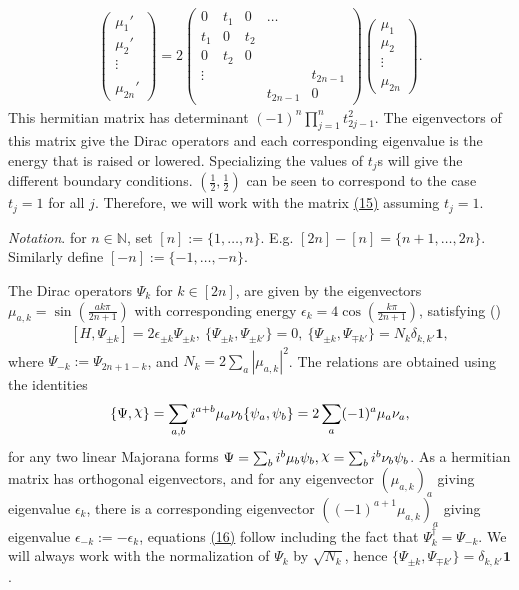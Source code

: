 \documentclass[twoside,11pt,titlepage]{amsart}
\newcommand{\abs}[1]{\left| #1 \right|} %
\renewcommand{\=}[1]{\stackrel{#1}{=}} %
\theoremstyle{definition}
\theoremstyle{remark}
\DeclareRobustCommand{\rchi}{{\mathpalette\irchi\relax}}
\newcommand{\irchi}[2]{\raisebox{\depth}{$#1\chi$}}
\begin{document}
\begin{align}\label{eq15}
   \begin{pmatrix}
           \mu_1' \\
           \mu_{2}' \\
           \vdots \\
            \\
           \mu_{2n}'
         \end{pmatrix}
         = 2\begin{pmatrix}
         0 & t_1 & 0 & \ldots &  \\
         t_1 & 0 & t_2 & &  \\
         0 & t_2 & 0 & &   \\
         \vdots &  &  & & t_{2n-1} \\
         &  & & t_{2n-1} & 0 
         \end{pmatrix}
         \begin{pmatrix}
         \mu_1 \\
         \mu_{2} \\
         \vdots \\
            \\
         \mu_{2n}
         \end{pmatrix}.
\end{align}
This hermitian matrix has determinant $(-1)^n\prod_{j=1}^{n}t_{2j-1}^2$. The eigenvectors of this matrix give the Dirac operators and each corresponding eigenvalue is the energy that is raised or lowered. Specializing the values of $t_j$s will give the different boundary conditions. $(\frac{1}{2},\frac{1}{2})$ can be seen to correspond to the case $t_j=1$ for all $j$. Therefore, we will work with the matrix \hyperref[eq15]{\hyperref[eq15]{(15)}} assuming $t_j=1$. 

\textit{Notation}. for $n \in \mathbb{N}$, set $[n]:=\{1,\ldots,n\}$. E.g. $[2n]-[n]=\{n+1,\ldots,2n\}$. Similarly define $[-n]:=\{-1,\ldots,-n\}$.

The Dirac operators $\Psi_{k}$ for $k \in [2n]$, are given by the eigenvectors $\mu_{a,k}=\sin(\frac{ak\pi}{2n+1})$ with corresponding energy $\epsilon_k=4\cos(\frac{k\pi}{2n+1})$, satisfying (\cite{fendley2014free})
\begin{align}\label{eq16}
[H,\Psi_{\pm k}]=2 \epsilon_{\pm k} \Psi_{\pm k}, \ \{\Psi_{\pm k}, \Psi_{\pm k'} \}=0, \ \{\Psi_{\pm k}, \Psi_{\mp k'} \} = N_k \delta_{k,k'}\textbf{1},
\end{align}
where $\Psi_{-k}:=\Psi_{2n+1-k}$, and $N_k=2 \sum_{a} \abs{\mu_{a,k}}^2$. The relations are obtained using the identities
$$\{\Psi,\rchi\}=\sum_{a,b} i^{a+b} \mu_a \nu_b \{\psi_a,\psi_b\}=2\sum_a (-1)^a \mu_a\nu_a,$$
for any two linear Majorana forms $\Psi = \sum_b i^b \mu_b \psi_b,\rchi=\sum_b i^b \nu_b \psi_b$. As a hermitian matrix has orthogonal eigenvectors, and for any eigenvector $(\mu_{a,k})_a$ giving eigenvalue $\epsilon_k$, there is a corresponding eigenvector  $((-1)^{a+1}\mu_{a,k})_a$ giving eigenvalue $\epsilon_{-k}:= -\epsilon_k$, equations \hyperref[eq16]{(16)} follow including the fact that $\Psi_{k}^{\dagger}=\Psi_{-k}$. We will always work with the normalization of $\Psi_k$ by $\sqrt{N_k}$, hence $\{\Psi_{\pm k}, \Psi_{\mp k'} \} = \delta_{k,k'}\textbf{1}$.
\end{document}
